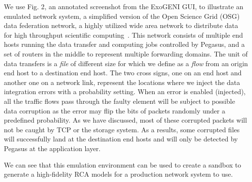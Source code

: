 We use Fig. 2, an annotated screenshot from the ExoGENI GUI, to illustrate an emulated network system, a simplified version of the Open Science Grid (OSG) data federation network, a highly utilized wide area network to distribute data for high throughput scientific computing~\cite{OSG:web}. This network consists of multiple end hosts running the data transfer and computing jobs controlled by Pegasus, and a set of routers in the middle to represent multiple forwarding domains. The unit of data transfers is a {\it file} of different size for which we define as a {\it flow} from an origin end host to a destination end host. The two cross signs, one on an 
end host and another one on a network link, represent the locations where we inject the data integration errors with a probability setting. When an error is enabled (injected), all the traffic flows pass through the faulty element will be subject to possible data corruption as the error may flip the bits of packets randomly under a predefined probability. As we have discussed, most of these corrupted packets will not be caught by TCP or the storage system. As a results, some corrupted files will successfully land at the destination end hosts and will only be detected by Pegasus at the application layer. 

We can see that this emulation environment can be used to create a sandbox to generate a high-fidelity RCA models for a production network system to use. 